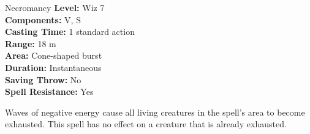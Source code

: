 {Necromancy}
{
	\textbf{Level:}
	Wiz 7\\
	\textbf{Components:}
	V, S\\
	\textbf{Casting Time:}
	1 standard action\\
	\textbf{Range:}
	18 m\\
	\textbf{Area:}
	Cone-shaped burst\\
	\textbf{Duration:}
	Instantaneous\\
	\textbf{Saving Throw:}
	No\\
	\textbf{Spell Resistance:}
	Yes\\
}
{
	Waves of negative energy cause all living creatures in the spell's area to become exhausted. This spell has no effect on a creature that is already exhausted.

}
